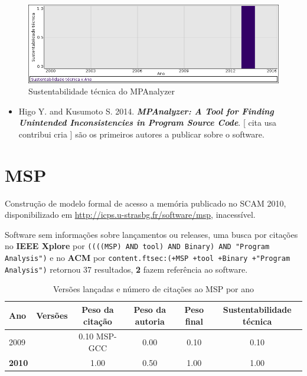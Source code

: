 \begin{figure}[h]
  \center
  \includegraphics[scale=0.50]{imagens/softwares-charts/mpanalyzer.png}
  \caption{Sustentabilidade técnica do MPAnalyzer}
\end{figure}


\begin{itemize}
\item Higo Y. and Kusumoto S.
      2014.
        \textbf{\textit{ MPAnalyzer: A Tool for Finding Unintended Inconsistencies in Program Source Code}}.
      [
          cita
          usa
          contribui
          cria
      ]
são os primeiros autores a publicar sobre o software.
\end{itemize}
\section{MSP}

Construção de modelo formal de acesso a memória
publicado no SCAM 2010,
disponibilizado em \url{http://icps.u-strasbg.fr/software/msp},
inacessível.

Software sem informações sobre lançamentos ou releases,
uma busca por citações no {\bf IEEE Xplore} por
\texttt{((((MSP) AND tool) AND Binary) AND "Program Analysis")}
e no {\bf ACM} por
\texttt{content.ftsec:(+MSP +tool +Binary +"Program Analysis")}
retornou
37 resultados,
{\bf 2} fazem referência ao software.


\begin{table}[H]
\caption{Versões lançadas e número de citações ao MSP por ano}
\centering
\begin{tabular}{| l | c | c | c | c | c |}
  \hline
  Ano & Versões & Peso da citação & Peso da autoria & Peso final & Sustentabilidade técnica \\
  \hline
            2009
          &
          
          &
          0.10
            {\tiny MSP-GCC}
          &
          0.00
          &
          0.10
          &
            {\color{red} 0.10}
          \\
\hline
            {\bf 2010}
          &
          
          &
          1.00
          &
          0.50
          &
          1.00
          &
            {\color{blue} 1.00}
          \\
\hline
\end{tabular}
\end{table}


